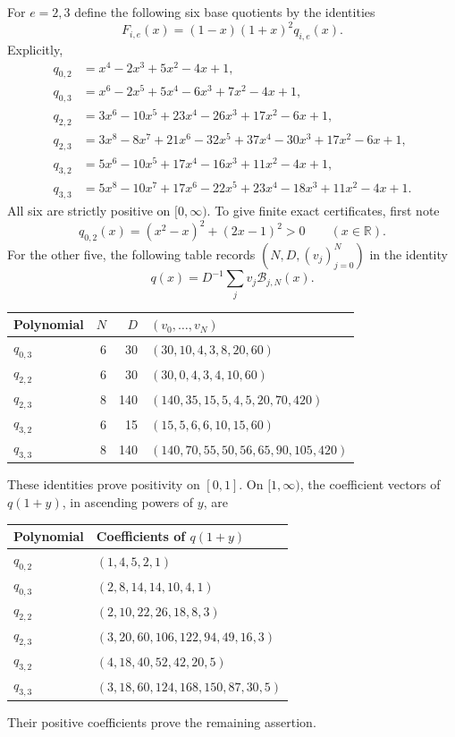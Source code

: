 \documentclass[11pt,a4paper]{article}
\theoremstyle{definition}\newtheorem{definition}[theorem]{Definition}
\theoremstyle{remark}\newtheorem{remark}[theorem]{Remark}
\begin{document}
For $e=2,3$ define the following six base quotients by the identities
\[
 F_{i,e}(x)=(1-x)(1+x)^2q_{i,e}(x).
 \tag{S3}\label{eq:stern-S3}
\]
Explicitly,
\begin{align*}
q_{0,2}&=x^4-2x^3+5x^2-4x+1,\\
q_{0,3}&=x^6-2x^5+5x^4-6x^3+7x^2-4x+1,\\
q_{2,2}&=3x^6-10x^5+23x^4-26x^3+17x^2-6x+1,\\
q_{2,3}&=3x^8-8x^7+21x^6-32x^5+37x^4-30x^3+17x^2-6x+1,\\
q_{3,2}&=5x^6-10x^5+17x^4-16x^3+11x^2-4x+1,\\
q_{3,3}&=5x^8-10x^7+17x^6-22x^5+23x^4-18x^3+11x^2-4x+1.
\end{align*}
All six are strictly positive on $[0,\infty)$. To give finite exact
certificates, first note
\[
 q_{0,2}(x)=(x^2-x)^2+(2x-1)^2>0\qquad(x\in\mathbb R).
\]
For the other five, the following table records $(N,D,(v_j)_{j=0}^N)$
in the identity
\[
q(x)=D^{-1}\sum_jv_j\mathcal B_{j,N}(x).
\]
\begin{center}\small
\begin{tabular}{@{}lrrl@{}}
\toprule
Polynomial & $N$ & $D$ & $(v_0,\ldots,v_N)$ \\
\midrule
$q_{0,3}$ & 6 & 30 & $(30,10,4,3,8,20,60)$\\
$q_{2,2}$ & 6 & 30 & $(30,0,4,3,4,10,60)$\\
$q_{2,3}$ & 8 & 140 & $(140,35,15,5,4,5,20,70,420)$\\
$q_{3,2}$ & 6 & 15 & $(15,5,6,6,10,15,60)$\\
$q_{3,3}$ & 8 & 140 & $(140,70,55,50,56,65,90,105,420)$\\
\bottomrule
\end{tabular}
\end{center}
These identities prove positivity on $[0,1]$. On $[1,\infty)$, the
coefficient vectors of $q(1+y)$, in ascending powers of $y$, are
\begin{center}\small
\begin{tabular}{@{}ll@{}}
\toprule
Polynomial & Coefficients of $q(1+y)$ \\
\midrule
$q_{0,2}$ & $(1,4,5,2,1)$\\
$q_{0,3}$ & $(2,8,14,14,10,4,1)$\\
$q_{2,2}$ & $(2,10,22,26,18,8,3)$\\
$q_{2,3}$ & $(3,20,60,106,122,94,49,16,3)$\\
$q_{3,2}$ & $(4,18,40,52,42,20,5)$\\
$q_{3,3}$ & $(3,18,60,124,168,150,87,30,5)$\\
\bottomrule
\end{tabular}
\end{center}
Their positive coefficients prove the remaining assertion.
\end{document}
